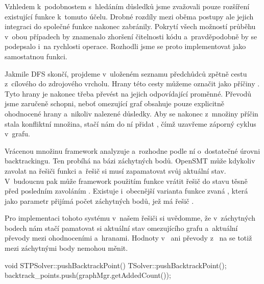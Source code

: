 Vzhledem k~podobnostem s~hledáním důsledků jsme zvažovali pouze rozšíření existující funkce  k~tomuto účelu. Drobné rozdíly mezi oběma postupy ale jejich integraci do společné funkce nakonec zabránily. Pokrytí všech možností průběhu v~obou případech by znamenalo zhoršení čitelnosti kódu a~pravděpodobně by se podepsalo i~na rychlosti operace. Rozhodli jsme se proto implementovat  jako samostatnou funkci.

Jakmile DFS skončí, projdeme v~uloženém seznamu předchůdců zpětně cestu z~cílového do zdrojového vrcholu. Hrany této cesty můžeme označit jako příčiny . Tyto hrany je nakonec třeba převést na jejich odpovídající  proměnné. Převodů jsme zaručeně schopni, neboť omezující graf obsahuje pouze explicitně ohodnocené hrany a~nikoliv nalezené důsledky. Aby se nakonec z~množiny příčin stala konfliktní množina, stačí nám do ní přidat , čímž uzavřeme záporný cyklus v~grafu. 


Vrácenou množinu framework analyzuje a~rozhodne podle ní o~dostatečné úrovni backtrackingu. Ten probíhá na bázi záchytných bodů. OpenSMT může kdykoliv zavolat na řešiči funkci  a~řešič si musí zapamatovat svůj aktuální stav. V~budoucnu pak může framework použitím funkce  vrátit řešič do stavu těsně před posledním zavoláním . Existuje i~obecnější varianta funkce zvaná , která jako parametr přijímá počet záchytných bodů, jež má řešič .

Pro implementaci tohoto systému v~našem řešiči si uvědomme, že v~záchytných bodech nám stačí pamatovat si aktuální stav omezujícího grafu a~aktuální převody mezi ohodnoceními a~hranami. Hodnoty v~ ani převody z~ na  se totiž mezi záchytnými body nemohou měnit.

\begin{code}
void STPSolver::pushBacktrackPoint() {
	TSolver::pushBacktrackPoint();
	backtrack_points.push(graphMgr.getAddedCount());
}
\end{code}

